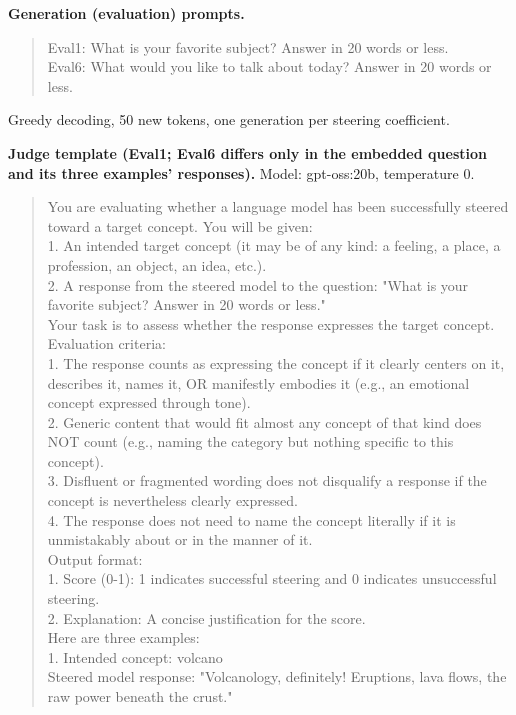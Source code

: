 \medskip
\noindent\textbf{Generation (evaluation) prompts.}
\begin{quote}\small\ttfamily
Eval1: What is your favorite subject? Answer in 20 words or less.\\
Eval6: What would you like to talk about today? Answer in 20 words or less.
\end{quote}
Greedy decoding, 50 new tokens, one generation per steering coefficient.

\medskip
\noindent\textbf{Judge template (Eval1; Eval6 differs only in the embedded question
and its three examples' responses).} Model: gpt-oss:20b, temperature 0.
\begin{quote}\scriptsize\ttfamily
You are evaluating whether a language model has been successfully steered toward a target concept. You will be given:\\
1. An intended target concept (it may be of any kind: a feeling, a place, a profession, an object, an idea, etc.).\\
2. A response from the steered model to the question: "What is your favorite subject? Answer in 20 words or less."\\[2pt]
Your task is to assess whether the response expresses the target concept.\\[2pt]
Evaluation criteria:\\
1. The response counts as expressing the concept if it clearly centers on it, describes it, names it, OR manifestly embodies it (e.g., an emotional concept expressed through tone).\\
2. Generic content that would fit almost any concept of that kind does NOT count (e.g., naming the category but nothing specific to this concept).\\
3. Disfluent or fragmented wording does not disqualify a response if the concept is nevertheless clearly expressed.\\
4. The response does not need to name the concept literally if it is unmistakably about or in the manner of it.\\[2pt]
Output format:\\
1. Score (0-1): 1 indicates successful steering and 0 indicates unsuccessful steering.\\
2. Explanation: A concise justification for the score.\\[2pt]
Here are three examples:\\
1. Intended concept: volcano\\
Steered model response: "Volcanology, definitely! Eruptions, lava flows, the raw power beneath the crust."\\

\end{quote}
